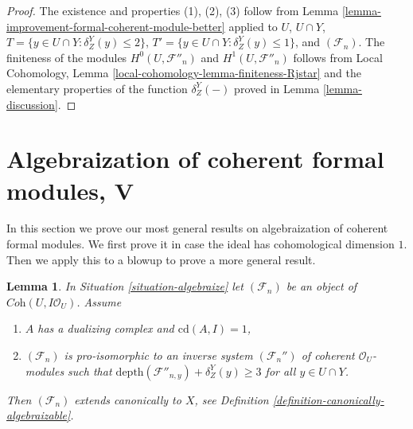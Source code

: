 \documentclass{stacks-project}
\theoremstyle{plain}
\newtheorem{lemma}[subsection]{Lemma}
\theoremstyle{definition}
\theoremstyle{remark}
\numberwithin{equation}{subsection}
\begin{document}
\begin{proof}
The existence and properties (1), (2), (3) follow from
Lemma \ref{lemma-improvement-formal-coherent-module-better} applied
to $U$, $U \cap Y$, $T = \{y \in U \cap Y : \delta^Y_Z(y) \leq 2\}$,
$T' = \{y \in U \cap Y : \delta^Y_Z(y) \leq 1\}$, and $(\mathcal{F}_n)$.
The finiteness of the modules $H^0(U, \mathcal{F}''_n)$ and
$H^1(U, \mathcal{F}''_n)$ follows from
Local Cohomology, Lemma \ref{local-cohomology-lemma-finiteness-Rjstar}
and the elementary properties of the function $\delta^Y_Z(-)$
proved in Lemma \ref{lemma-discussion}.
\end{proof}











\section{Algebraization of coherent formal modules, V}
\label{section-algebraization-modules-conclusion}

\noindent
In this section we prove our most general results on algebraization
of coherent formal modules. We first prove it in case
the ideal has cohomological dimension $1$. Then we apply this
to a blowup to prove a more general result.

\begin{lemma}
\label{lemma-cd-1-canonical}
In Situation \ref{situation-algebraize} let $(\mathcal{F}_n)$
be an object of $\textit{Coh}(U, I\mathcal{O}_U)$. Assume
\begin{enumerate}
\item $A$ has a dualizing complex and $\text{cd}(A, I) = 1$,
\item $(\mathcal{F}_n)$ is pro-isomorphic to an inverse system
$(\mathcal{F}_n'')$ of coherent $\mathcal{O}_U$-modules such that
$\text{depth}(\mathcal{F}''_{n, y}) + \delta^Y_Z(y) \geq 3$
for all $y \in U \cap Y$.
\end{enumerate}
Then $(\mathcal{F}_n)$ extends canonically to $X$, see
Definition \ref{definition-canonically-algebraizable}.
\end{lemma}
\end{document}
